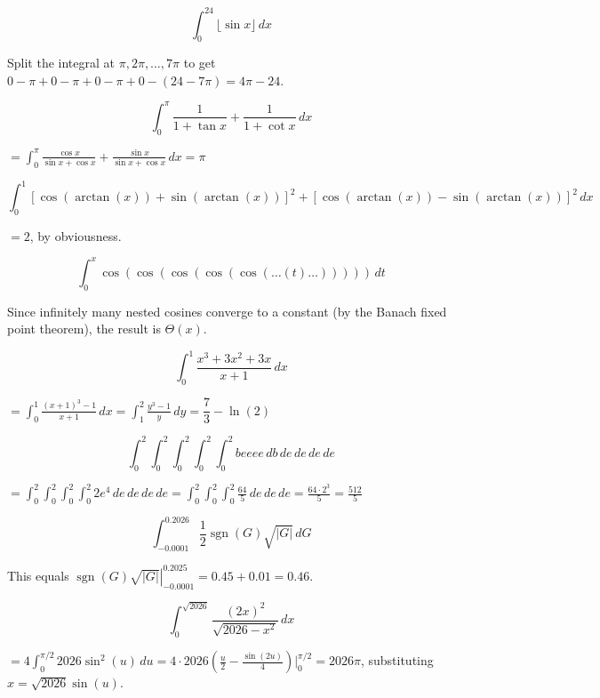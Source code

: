 \begin{questions}
\question \[ \int_0^{24} \lfloor \sin x\rfloor\, dx \]
\begin{solution}
Split the integral at $\pi,2\pi,\dots,7\pi$ to get $0-\pi+0-\pi+0-\pi+0-(24-7\pi) = 4\pi-24$.
\end{solution}

\question \[ \int_0^{\pi} \frac{1}{1+\tan x} + \frac{1}{1+\cot x}\, dx \]
\begin{solution}
$= \displaystyle\int_0^\pi \frac{\cos x}{\sin x+\cos x}+\frac{\sin x}{\sin x+\cos x}\, dx = \pi$
\end{solution}

\question \[ \int_0^1 \left[\cos(\arctan(x))+\sin(\arctan(x))\right]^2+\left[\cos(\arctan(x))-\sin(\arctan(x))\right]^2\, dx \]
\begin{solution}
$= 2$, by obviousness.
\end{solution}

\question \[ \int_0^x \cos(\cos(\cos(\cos(\cos(\ldots(t)\ldots)))))\, dt \]
\begin{solution}
Since infinitely many nested cosines converge to a constant (by the Banach fixed point theorem), the result is $\Theta(x)$.
\end{solution}

\question \[ \int_0^1 \frac{x^3+3x^2+3x}{x+1}\, dx \]
\begin{solution}
$= \displaystyle\int_0^1 \frac{(x+1)^3-1}{x+1}\, dx = \int_1^2 \frac{y^3-1}{y}\, dy = \dfrac{7}{3}-\ln(2)$
\end{solution}

\question \[ \int_0^2\int_0^2\int_0^2\int_0^2\int_0^2 beeee\, db\, de\, de\, de\, de \]
\begin{solution}
$= \displaystyle\int_0^2\int_0^2\int_0^2\int_0^2 2e^4\, de\, de\, de\, de = \int_0^2\int_0^2\int_0^2 \frac{64}{5}\, de\, de\, de = \frac{64\cdot 2^3}{5} = \frac{512}{5}$
\end{solution}

\question \[ \int_{-0.0001}^{0.2026} \frac{1}{2}\operatorname{sgn}(G)\sqrt{|G|}\, dG \]
\begin{solution}
This equals $\left.\operatorname{sgn}(G)\sqrt{|G|}\right|_{-0.0001}^{0.2025} = 0.45+0.01 = 0.46$.
\end{solution}

\question \[ \int_0^{\sqrt{2026}} \frac{(2x)^2}{\sqrt{2026-x^2}}\, dx \]
\begin{solution}
$= 4\displaystyle\int_0^{\pi/2} 2026\sin^2(u)\, du = 4\cdot 2026\left(\frac{u}{2}-\frac{\sin(2u)}{4}\right)\Big|_0^{\pi/2} = 2026\pi$,
substituting $x=\sqrt{2026}\sin(u)$.
\end{solution}


\end{questions}
